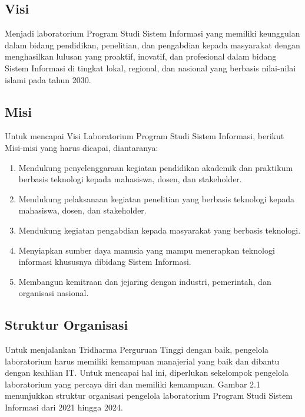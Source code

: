 \subsection{Visi}
Menjadi laboratorium Program Studi Sistem Informasi yang memiliki keunggulan dalam bidang pendidikan, penelitian, dan pengabdian kepada masyarakat dengan menghasilkan lulusan yang proaktif, inovatif, dan profesional dalam bidang Sistem Informasi di tingkat lokal, regional, dan nasional yang berbasis nilai-nilai islami pada tahun 2030.
\subsection{Misi}
Untuk mencapai Visi Laboratorium Program Studi Sistem Informasi, berikut Misi-misi yang harus dicapai, diantaranya:

\begin{enumerate}

  \item Mendukung penyelenggaraan kegiatan pendidikan akademik dan praktikum berbasis teknologi kepada mahasiswa, dosen, dan stakeholder.
  \item Mendukung pelaksanaan kegiatan penelitian yang berbasis teknologi kepada mahasiswa, dosen, dan stakeholder.
  \item Mendukung kegiatan pengabdian kepada masyarakat yang berbasis teknologi.
  \item Menyiapkan sumber daya manusia yang mampu menerapkan teknologi informasi khususnya dibidang Sistem Informasi.
  \item Membangun kemitraan dan jejaring dengan industri, pemerintah, dan organisasi nasional.

\end{enumerate}
\subsection{Struktur Organisasi}
Untuk menjalankan Tridharma Perguruan Tinggi dengan baik, pengelola laboratorium harus memiliki kemampuan manajerial yang baik dan dibantu dengan keahlian IT. Untuk mencapai hal ini, diperlukan sekelompok pengelola laboratorium yang percaya diri dan memiliki kemampuan. Gambar 2.1 menunjukkan struktur organisasi pengelola laboratorium Program Studi Sistem Informasi dari 2021 hingga 2024.

